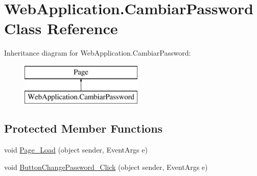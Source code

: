 \hypertarget{classWebApplication_1_1CambiarPassword}{}\section{Web\+Application.\+Cambiar\+Password Class Reference}
\label{classWebApplication_1_1CambiarPassword}
Inheritance diagram for Web\+Application.\+Cambiar\+Password\+:\begin{figure}[H]
\begin{center}
\leavevmode
\includegraphics[height=2.000000cm]{db/d1f/classWebApplication_1_1CambiarPassword}
\end{center}
\end{figure}
\subsection*{Protected Member Functions}
\begin{DoxyCompactItemize}
\item 
void \mbox{\hyperlink{classWebApplication_1_1CambiarPassword_a429a7b26a29f62156be73195797a15de}{Page\+\_\+\+Load}} (object sender, Event\+Args e)
\item 
void \mbox{\hyperlink{classWebApplication_1_1CambiarPassword_a16763411a7d5b22456dddfc48a50ac9b}{Button\+Change\+Password\+\_\+\+Click}} (object sender, Event\+Args e)
\end{DoxyCompactItemize}
